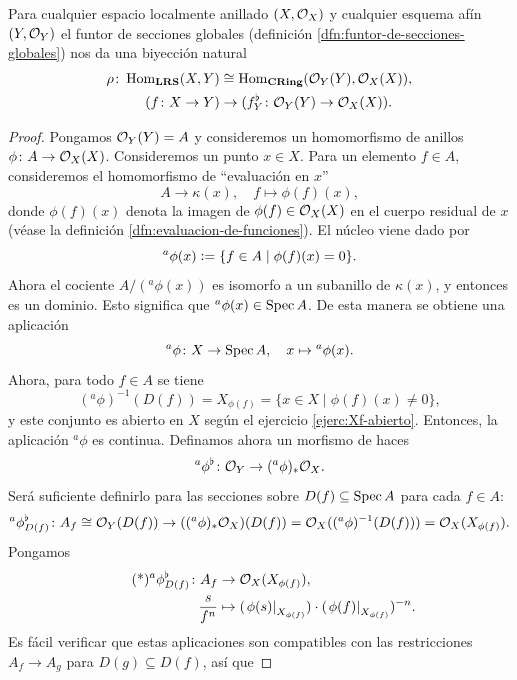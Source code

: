 \documentclass{article}
\numberwithin{equation}{section}
\theoremstyle{definition}
\begin{document}
\begin{teorema}
  \label{thm:EGA-1-6-3}
  Para cualquier espacio localmente anillado $(X,\mathcal{O}_X)$ y cualquier esquema afín
  $(Y,\mathcal{O}_Y)$ el funtor de secciones globales (definición
  \ref{dfn:funtor-de-secciones-globales}) nos da una biyección natural
  \begin{align*}
    \rho\colon \operatorname{Hom}_{\text{\bf LRS}} (X, Y) & \cong \operatorname{Hom}_{\text{\bf CRing}} (\mathcal{O}_Y (Y), \mathcal{O}_X (X)),\\
    (f\colon X \to Y) & \to (f^\flat_Y\colon \mathcal{O}_Y (Y) \to \mathcal{O}_X (X)).
  \end{align*}

  \begin{proof}
    Pongamos $\mathcal{O}_Y (Y) = A$ y consideremos un homomorfismo de anillos
    $\phi\colon A\to \mathcal{O}_X (X)$. Consideremos un punto $x \in X$.
    Para un elemento $f \in A$, consideremos el homomorfismo de
    ``evaluación en $x$''
    $$A \to \kappa (x), \quad f \mapsto \phi (f) (x),$$
    donde $\phi (f) (x)$ denota la imagen de $\phi (f) \in \mathcal{O}_X (X)$ en
    el cuerpo residual de $x$ (véase la definición
    \ref{dfn:evaluacion-de-funciones}). El núcleo viene dado por
    $${}^a \phi (x) \mathrel{\mathop:}= \{ f \in A \mid \phi (f) (x) = 0 \}.$$
    Ahora el cociente $A / ({}^a \phi (x))$ es isomorfo a un subanillo
    de $\kappa (x)$, y entonces es un dominio. Esto significa que
    ${}^a \phi (x) \in \operatorname{Spec} A$. De esta manera se obtiene una aplicación
    $${}^a \phi\colon X \to \operatorname{Spec} A, \quad x \mapsto {}^a \phi (x).$$
    Ahora, para todo $f \in A$ se tiene
    $$({}^a \phi)^{-1} (D (f)) = X_{\phi (f)} = \{ x\in X \mid \phi (f) (x) \ne 0 \},$$
    y este conjunto es abierto en $X$ según el ejercicio
    \ref{ejerc:Xf-abierto}. Entonces, la aplicación ${}^a \phi$ es
    continua. Definamos ahora un morfismo de haces
    $${}^a \phi^\flat\colon \mathcal{O}_Y \to ({}^a \phi)_* \mathcal{O}_X.$$
    Será suficiente definirlo para las secciones sobre $D (f) \subseteq \operatorname{Spec} A$
    para cada $f \in A$:
    \[ {}^a \phi^\flat_{D (f)}\colon A_f \cong \mathcal{O}_Y (D (f)) \to
       (({}^a \phi)_* \mathcal{O}_X) (D (f)) =
       \mathcal{O}_X (({}^a \phi)^{-1} (D (f))) = \mathcal{O}_X (X_{\phi (f)}). \]
    Pongamos
    \begin{align*}
      \tag{*} {}^a \phi^\flat_{D (f)}\colon A_f & \to \mathcal{O}_X (X_{\phi (f)}),\\
      \frac{s}{f^n} & \mapsto (\left.\phi (s)\right|_{X_{\phi (f)}})\cdot (\left.\phi (f)\right|_{X_{\phi (f)}})^{-n}.
    \end{align*}
    Es fácil verificar que estas aplicaciones son compatibles con
    las restricciones $A_f \to A_g$ para $D (g) \subseteq D (f)$, así que

\end{proof}
\end{teorema}
\end{document}
